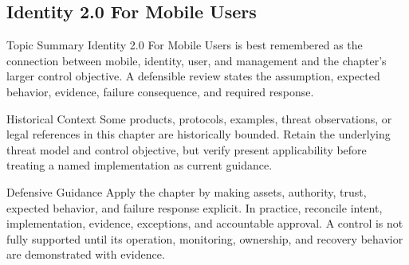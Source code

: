 \documentclass[11pt,letterpaper]{article}
\begin{document}
\subsection*{Identity 2.0 For Mobile Users}
\begin{CornellNotesTable}
\end{CornellNotesTable}
\begin{CornellSummaryBox}{Topic Summary}
Identity 2.0 For Mobile Users is best remembered as the connection between mobile, identity, user, and management and the chapter's larger control objective. A defensible review states the assumption, expected behavior, evidence, failure consequence, and required response.
\end{CornellSummaryBox}
\begin{CornellWarningBox}{Historical Context}
Some products, protocols, examples, threat observations, or legal references in this chapter are historically bounded. Retain the underlying threat model and control objective, but verify present applicability before treating a named implementation as current guidance.
\end{CornellWarningBox}
\begin{CornellOverviewBox}{Defensive Guidance}
Apply the chapter by making assets, authority, trust, expected behavior, and failure response explicit. In practice, reconcile intent, implementation, evidence, exceptions, and accountable approval. A control is not fully supported until its operation, monitoring, ownership, and recovery behavior are demonstrated with evidence.
\end{CornellOverviewBox}
\end{document}

